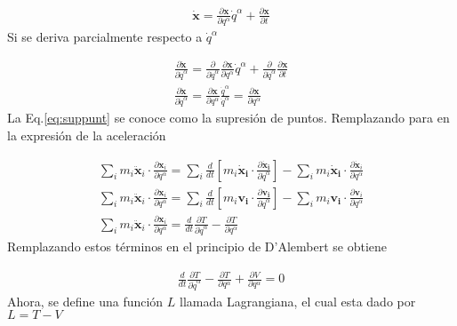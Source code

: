 \begin{gather*}
    \mathbf{\dot{x}} = \frac{\partial \mathbf{x}}{\partial q^{\alpha}}\dot{q}^{\alpha} + \frac{\partial \mathbf{x}}{\partial t}
\end{gather*}
Si se deriva parcialmente respecto a $\dot{q}^{\alpha}$

\begin{gather}
    \frac{\partial \mathbf{\dot{x}}}{\partial \dot{q}^{\alpha}} = \frac{\partial}{\partial \dot{q}^{\alpha}}\frac{\partial \mathbf{x}}{\partial q^{\alpha}}\dot{q}^{\alpha} + \frac{\partial}{\partial \dot{q}^{\alpha}}\frac{\partial \mathbf{x}}{\partial t} \\
    \label{eq:suppunt}\frac{\partial \mathbf{\dot{x}}}{\partial \dot{q}^{\alpha}} = \frac{\partial \mathbf{x}}{\partial q^{\alpha}}\frac{\dot{q}^{\alpha}}{\dot{q}^{\alpha}} = \frac{\partial \mathbf{x}}{\partial q^{\alpha}} 
\end{gather}
La Eq.\ref*{eq:suppunt} se conoce como la supresión de puntos. Remplazando para en la expresión de la aceleración 
    
\begin{gather*}
    \sum_i m_i\ddot{\mathbf{x}}_i\cdot  \frac{\partial \mathbf{x}_i} {\partial q^{\alpha}} = \sum_i\frac{d}{dt}\left[m_i\mathbf{\dot{x}_i} \cdot  \frac{\partial \mathbf{\dot{x}_i}}{\partial \dot{q}^{\alpha}}\right] - \sum_im_i\mathbf{\dot{x}_i} \cdot \frac{\partial \mathbf{\dot{x}}_i}{\partial q^{\alpha}}\\ 
    \sum_i m_i\ddot{\mathbf{x}}_i\cdot  \frac{\partial \mathbf{x}_i} {\partial q^{\alpha}} = \sum_i\frac{d}{dt}\left[m_i\mathbf{v_i} \cdot  \frac{\partial \mathbf{v_i}}{\partial \dot{q}^{\alpha}}\right] - \sum_im_i\mathbf{v_i} \cdot \frac{\partial \mathbf{v}_i}{\partial q^{\alpha}}\\
    \sum_i m_i\ddot{\mathbf{x}}_i\cdot  \frac{\partial \mathbf{x}_i} {\partial q^{\alpha}} = \frac{d}{dt}  \frac{\partial T}{\partial \dot{q}^{\alpha}} -\frac{\partial T}{\partial q^{\alpha}}
\end{gather*}
Remplazando estos términos en el principio de D'Alembert se obtiene 

\begin{gather*}
    \frac{d}{dt}  \frac{\partial T}{\partial \dot{q}^{\alpha}} -\frac{\partial T}{\partial q^{\alpha}} + \frac{\partial V}{\partial q^{\alpha}}  = 0
\end{gather*}
Ahora, se define una función $L$ llamada Lagrangiana, el cual esta dado por $L = T - V$

